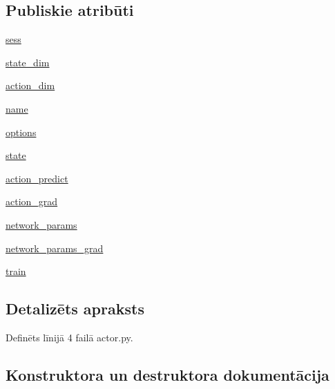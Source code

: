 \subsection*{Publiskie atribūti}
\begin{DoxyCompactItemize}
\item 
\hyperlink{classactor_1_1_actor_network_ae8daea79f8d1f754c3d44c76036da21a}{sess}
\item 
\hyperlink{classactor_1_1_actor_network_a5a97fa085ad81efe114122af1cff8d26}{state\+\_\+dim}
\item 
\hyperlink{classactor_1_1_actor_network_ada197a9b6d5e1b5ebcdcc360d11e4f1b}{action\+\_\+dim}
\item 
\hyperlink{classactor_1_1_actor_network_adecdbb6d5d6d12f4c9d36b22bd9ad6c4}{name}
\item 
\hyperlink{classactor_1_1_actor_network_af7cdb447ae7a2a605a9a22336297d34f}{options}
\item 
\hyperlink{classactor_1_1_actor_network_ab3bae8f52b46f6b7ee7c9f4f0cd21c45}{state}
\item 
\hyperlink{classactor_1_1_actor_network_a8cbb128a36aa9bc9279880c34d503af3}{action\+\_\+predict}
\item 
\hyperlink{classactor_1_1_actor_network_a1420ab0da00328629de6fe8087c4c4e7}{action\+\_\+grad}
\item 
\hyperlink{classactor_1_1_actor_network_ae0bac8c1fdcbdf33f9651444e66f9e09}{network\+\_\+params}
\item 
\hyperlink{classactor_1_1_actor_network_ae6932b19d7a23205226ab1bc454a5693}{network\+\_\+params\+\_\+grad}
\item 
\hyperlink{classactor_1_1_actor_network_a10e3ddfa0963a82bec05f3a0fa59d023}{train}
\end{DoxyCompactItemize}


\subsection{Detalizēts apraksts}


Definēts līnijā 4 failā actor.\+py.



\subsection{Konstruktora un destruktora dokumentācija}
